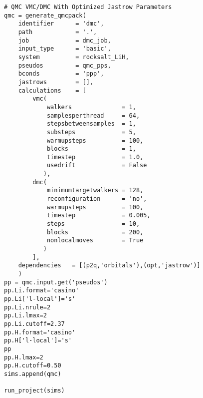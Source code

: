 \begin{lstlisting}[caption=Nexus example for bulk LiH using Quantum ESPRESSO orbitals and CASINO pseudopotentials]
# QMC VMC/DMC With Optimized Jastrow Parameters
qmc = generate_qmcpack(
    identifier      = 'dmc',
    path            = '.',
    job             = dmc_job,
    input_type      = 'basic',
    system          = rocksalt_LiH,
    pseudos         = qmc_pps,
    bconds          = 'ppp',
    jastrows        = [],
    calculations    = [
        vmc(
            walkers              = 1,
            samplesperthread     = 64,
            stepsbetweensamples  = 1,
            substeps             = 5,
            warmupsteps          = 100,
            blocks               = 1,
            timestep             = 1.0,
            usedrift             = False
           ),
        dmc(
            minimumtargetwalkers = 128,
            reconfiguration      = 'no',
            warmupsteps          = 100,
            timestep             = 0.005,
            steps                = 10,
            blocks               = 200,
            nonlocalmoves        = True
           )
        ],
    dependencies   = [(p2q,'orbitals'),(opt,'jastrow')]
    )
pp = qmc.input.get('pseudos')
pp.Li.format='casino'
pp.Li['l-local']='s'
pp.Li.nrule=2
pp.Li.lmax=2
pp.Li.cutoff=2.37
pp.H.format='casino'
pp.H['l-local']='s'
pp
pp.H.lmax=2
pp.H.cutoff=0.50
sims.append(qmc)

run_project(sims)
\end{lstlisting}
